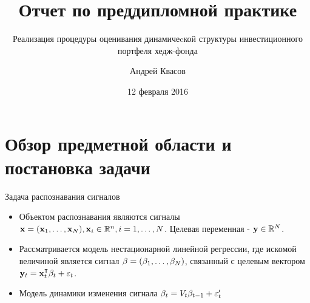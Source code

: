 \documentclass[11pt]{beamer}
\author{Андрей Квасов}
\title{Отчет по преддипломной практике}
\subtitle{Реализация процедуры оценивания динамичеcкой структуры инвестиционного портфеля хедж-фонда}
\institute{МГУ им. М.\ В.\ Ломоносова}
\date{12 февраля 2016}
\let\T\intercal
\def\bo_#1{\bold{#1}}
\begin{document}
\begin{frame}
\maketitle
\end{frame}



\section{Обзор предметной области и постановка задачи}
\begin{frame}{Задача распознавания сигналов}
\begin{itemize}
\item Объектом распознавания являются сигналы $\bo_x = (\bo_x_1,\dots,\bo_x_N), \bo_x_i \in \mathbb{R}^n, i=1,\dots,N$. Целевая переменная - $\bo_y \in \mathbb{R}^N$.
\item Рассматривается модель нестационарной линейной регрессии, где искомой величиной является сигнал $\bo_{\beta} = (\bo_{\beta}_1,\dots,\bo_\beta_N)$, связанный с целевым вектором $\bo_y_t = \bo_x_t^\T\bo_\beta_t + \varepsilon_t$. 
\item Модель динамики изменения сигнала $\bo_{\beta}_t = V_t\bo_{\beta}_{t-1} + \varepsilon^\prime_t$
\end{itemize}
\end{frame}
\end{document}
